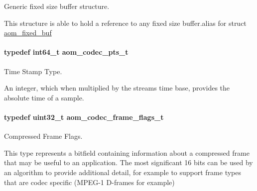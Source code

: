 Generic fixed size buffer structure. 

This structure is able to hold a reference to any fixed size buffer.\+alias for struct \hyperlink{structaom__fixed__buf}{aom\+\_\+fixed\+\_\+buf} 
\paragraph[{\texorpdfstring{aom\+\_\+codec\+\_\+pts\+\_\+t}{aom_codec_pts_t}}]{\setlength{\rightskip}{0pt plus 5cm}typedef int64\+\_\+t {\bf aom\+\_\+codec\+\_\+pts\+\_\+t}}\hypertarget{group__encoder_ga958524226c9a65251c9e4f7bb78fc606}{}\label{group__encoder_ga958524226c9a65251c9e4f7bb78fc606}


Time Stamp Type. 

An integer, which when multiplied by the stream\textquotesingle{}s time base, provides the absolute time of a sample. 
\paragraph[{\texorpdfstring{aom\+\_\+codec\+\_\+frame\+\_\+flags\+\_\+t}{aom_codec_frame_flags_t}}]{\setlength{\rightskip}{0pt plus 5cm}typedef uint32\+\_\+t {\bf aom\+\_\+codec\+\_\+frame\+\_\+flags\+\_\+t}}\hypertarget{group__encoder_gaf776d31e60e32bee1cdbaf052a8ea12a}{}\label{group__encoder_gaf776d31e60e32bee1cdbaf052a8ea12a}


Compressed Frame Flags. 

This type represents a bitfield containing information about a compressed frame that may be useful to an application. The most significant 16 bits can be used by an algorithm to provide additional detail, for example to support frame types that are codec specific (M\+P\+E\+G-\/1 D-\/frames for example) 
